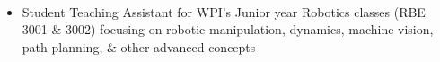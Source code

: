 \divider\\
    \begin{itemize}
        \item Student Teaching Assistant for WPI’s Junior year Robotics classes (RBE 3001 \& 3002) focusing on robotic manipulation, dynamics, machine vision, path-planning, \& other advanced concepts
    \end{itemize}